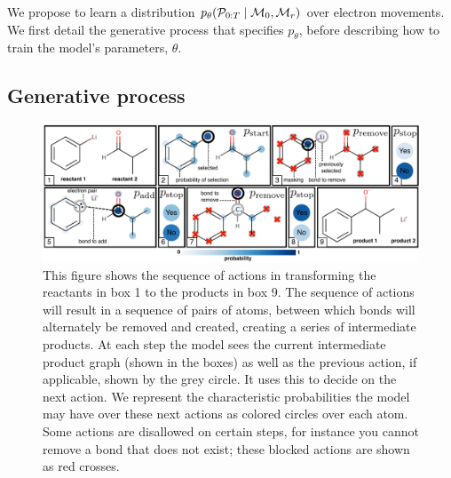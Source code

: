 We propose to learn a distribution $p_\theta( {\mathcal{P}}_{0:T} \mid {\mathcal{M}}_0, {\mathcal{M}}_r)$ over electron movements. 
We first detail the generative process %
that specifies $p_\theta$, before describing how to train the model's parameters, $\theta$.


\subsection{Generative process}


\begin{figure}
\centering
\includegraphics[width=\textwidth]{reaction_model_blue}
\caption{
 This figure shows the sequence of actions in transforming the reactants in box 1 to the products in box 9.
 The sequence of actions will result in a sequence of pairs of atoms, between which bonds will alternately be removed and created, creating a series of intermediate products. 
At each step the model sees the current intermediate product graph (shown in the boxes) as well as the previous action, if applicable, shown by the grey circle. It uses this to decide on the next action.
We represent the characteristic probabilities the model may have over these next actions as colored circles over each atom.
Some actions are disallowed on certain steps, for instance you cannot remove a bond that does not exist; these blocked actions are shown as red crosses.
}
\label{fig:reaction_model}
\end{figure}




